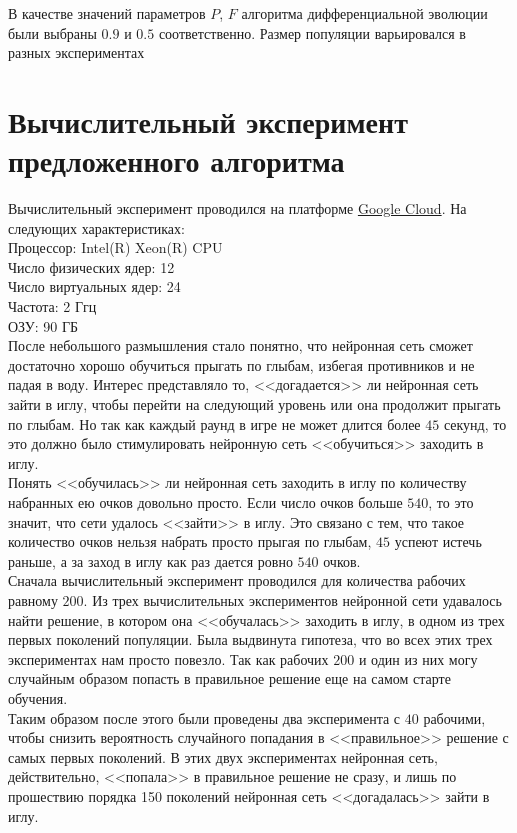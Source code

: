 \documentclass[12pt]{article}
\begin{document}
        В качестве значений параметров $P$, $F$ алгоритма дифференциальной эволюции были выбраны $0.9$ и $0.5$ соответственно. Размер популяции варьировался в разных экспериментах

\section{Вычислительный эксперимент предложенного алгоритма}
    Вычислительный эксперимент проводился на платформе \href{https://cloud.google.com/}{Google Cloud}. На следующих характеристиках: \\

    Процессор: Intel(R) Xeon(R) CPU \\
    Число физических ядер: 12 \\
    Число виртуальных ядер: 24 \\
    Частота: 2 Ггц \\
    ОЗУ: 90 ГБ \\

    После небольшого размышления стало понятно, что нейронная сеть сможет достаточно хорошо обучиться прыгать по глыбам, избегая противников и не падая в воду. Интерес представляло то, <<догадается>> ли нейронная сеть зайти в иглу, чтобы перейти на следующий уровень или она продолжит прыгать по глыбам. Но так как каждый раунд в игре не может длится более $45$ секунд, то это должно было стимулировать нейронную сеть <<обучиться>> заходить в иглу. \\

    Понять <<обучилась>> ли нейронная сеть заходить в иглу по количеству набранных ею очков довольно просто. Если число очков больше $540$, то это значит, что сети удалось <<зайти>> в иглу. Это связано с тем, что такое количество очков нельзя набрать просто прыгая по глыбам, $45$ успеют истечь раньше, а за заход в иглу как раз дается ровно $540$ очков. \\

    Сначала вычислительный эксперимент проводился для количества рабочих равному $200$. Из трех вычислительных экспериментов нейронной сети удавалось найти решение, в котором она <<обучалась>> заходить в иглу, в одном из трех первых поколений популяции. Была выдвинута гипотеза, что во всех этих трех экспериментах нам просто повезло. Так как рабочих $200$ и один из них могу случайным образом попасть в правильное решение еще на самом старте обучения. \\

    Таким образом после этого были проведены два эксперимента с $40$ рабочими, чтобы снизить вероятность случайного попадания в <<правильное>> решение с самых первых поколений. В этих двух экспериментах нейронная сеть, действительно, <<попала>> в правильное решение не сразу, и лишь по прошествию порядка 150 поколений нейронная сеть <<догадалась>> зайти в иглу. \\
\end{document}
